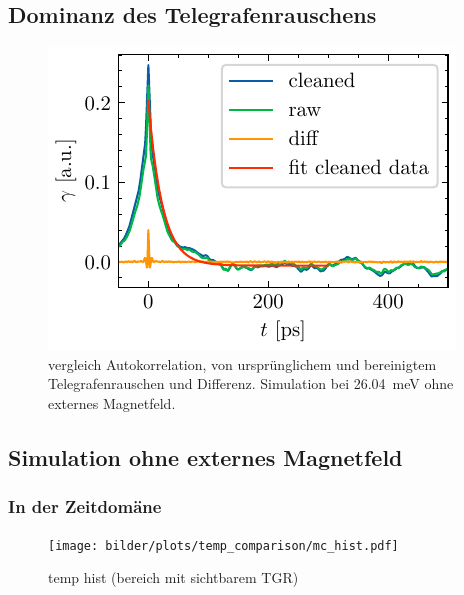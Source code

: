 \documentclass[main.tex]{subfiles}
\begin{document}


\subsection*{Dominanz des Telegrafenrauschens}

\begin{figure}[h]
    \centering
    \includegraphics{bilder/plots/Bz_0mT/autocorr_26.03meV.pdf}
    \caption{vergleich Autokorrelation, von ursprünglichem und bereinigtem Telegrafenrauschen und Differenz. Simulation bei \SI{26.04}{\milli\electronvolt} ohne externes Magnetfeld.}\label{fig:autocorr}
\end{figure}

\subsection{Simulation ohne externes Magnetfeld}
\subsubsection{In der Zeitdomäne}

\begin{figure}[H]
    \centering
    \texttt{[image: bilder/plots/temp\_comparison/mc\_hist.pdf]}
    \caption{temp hist (bereich mit sichtbarem TGR)}\label{fig:temp-hist-tg}    
\end{figure}
\end{document}
